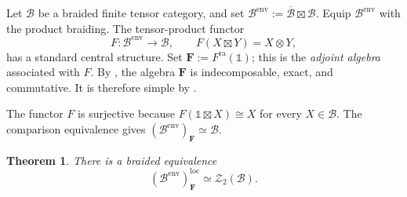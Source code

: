 \documentclass[11pt,reqno]{amsart}
\numberwithin{equation}{section}
\theoremstyle{plain}
\newtheorem{theorem}[thmctr]{Theorem}
\theoremstyle{definition}
\theoremstyle{remark}
\newcommand{\unit}{\mathds{1}}
\newcommand{\B}{\mathcal{B}}
\newcommand{\Z}{\mathcal{Z}}
\newcommand{\loc}{\mathrm{loc}}
\newcommand{\ra}{\mathrm{ra}}
\newcommand{\oB}{\overline{\B}}
\newcommand{\bF}{\mathbf{F}}
\begin{document}
Let $\B$ be a braided finite tensor category, and set
$\B^{\mathrm{env}}:=\oB\boxtimes\B$. Equip $\B^{\mathrm{env}}$ with the
product braiding. The tensor-product functor
\[
  F:\B^{\mathrm{env}}\longrightarrow\B,
  \qquad
  F(X\boxtimes Y)=X\otimes Y,
\]
has a standard central structure. Set $\bF:=F^\ra(\unit)$; this is the
\emph{adjoint algebra} associated with $F$. By
\cite[Proposition~6.6]{shimizu2026commutative}, the algebra $\bF$ is
indecomposable, exact, and commutative. It is therefore simple by
\cite[Theorem~7.1]{coulembier2025simple}.

The functor $F$ is surjective because $F(\unit\boxtimes X)\cong X$ for every
$X\in\B$. The comparison equivalence
\cite[Proposition~2.3]{etingof2004analogue} gives $(\B^{\mathrm{env}})_\bF\simeq\B$.

\begin{theorem}\label{thm:adjoint-algebra-local-modules}
There is a braided equivalence
\[
  (\B^{\mathrm{env}})_\bF^{\loc}\simeq\Z_2(\B).
\]
\end{theorem}
\end{document}
